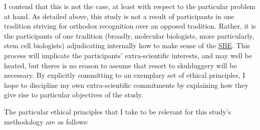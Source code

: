 I contend that this is not the case, at least with respect to the particular problem at hand. As detailed above, this study is not a result of participants in one tradition striving for orthodox recognition over an opposed tradition. Rather, it is the participants of one tradition (broadly, molecular biologists, more particularly, stem cell biologists) adjudicating internally how to make sense of the \hyperref[SBE]{SBE}. This process will implicate the participants' extra-scientific interests, and may well be heated, but theres is no reason to assume that resort to skulduggery will be necessary. By explicitly committing to an exemplary set of ethical principles, I hope to discipline my own extra-scientific commitments by explaining how they give rise to particular objectives of the study.

The particular ethical principles that I take to be relevant for this study's methodology are as follows:

